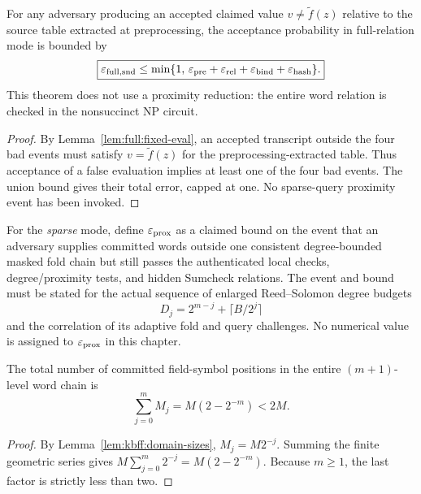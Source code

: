 \begin{theorem}\label{thm:full:sound-conditional}
For any adversary producing
an accepted claimed value
$v\neq\widetilde f(z)$
relative to the source table
extracted at preprocessing,
the acceptance probability
in full-relation mode is bounded by
\[
 \boxed{
 \varepsilon_{\rm full,snd}
 \le\min\{1,\,
 \varepsilon_{\rm pre}
 +\varepsilon_{\rm rel}
 +\varepsilon_{\rm bind}
 +\varepsilon_{\rm hash}\}.}
\]
This theorem does not
use a proximity reduction:
the entire word relation
is checked in the
nonsuccinct NP circuit.
\end{theorem}
\begin{proof}
By Lemma~\ref{lem:full:fixed-eval},
an accepted transcript outside
the four bad events must satisfy
$v=\widetilde f(z)$ for the
preprocessing-extracted table.
Thus acceptance of a false
evaluation implies at least
one of the four bad events.
The union bound gives their
total error, capped at one.
No sparse-query proximity
event has been invoked.
\end{proof}

\begin{definition}\label{def:full:proximity}
For the \emph{sparse} mode,
define $\varepsilon_{\rm prox}$
as a claimed bound on the event
that an adversary supplies
committed words outside one
consistent degree-bounded
masked fold chain but still
passes the authenticated
local checks, degree/proximity
tests, and hidden Sumcheck
relations. The event and bound
must be stated for the actual
sequence of enlarged Reed--Solomon
degree budgets
\[
 D_j=2^{m-j}+\lceil B/2^j\rceil
\]
and the correlation of its
adaptive fold and query challenges.
No numerical value is assigned
to $\varepsilon_{\rm prox}$
in this chapter.
\end{definition}

\begin{lemma}\label{lem:full:total-words}
The total number of committed
field-symbol positions in
the entire $(m+1)$-level
word chain is
\[
 \boxed{
 \sum_{j=0}^{m}M_j
 =M(2-2^{-m})<2M.}
\]
\end{lemma}
\begin{proof}
By Lemma~\ref{lem:kbff:domain-sizes},
$M_j=M2^{-j}$. Summing the finite
geometric series gives
$M\sum_{j=0}^m2^{-j}
=M(2-2^{-m})$.
Because $m\ge1$, the last
factor is strictly less than two.
\end{proof}

